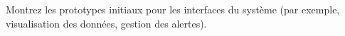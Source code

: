 Montrez les prototypes initiaux pour les interfaces du système (par exemple, visualisation des données, gestion des alertes).
